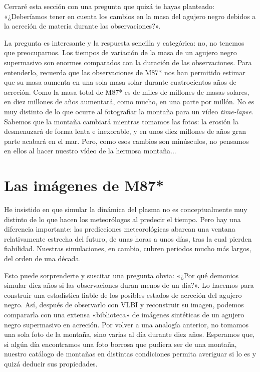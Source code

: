 Cerraré esta sección con una pregunta que quizá te hayas planteado: «¿Deberíamos tener en cuenta los cambios en la masa del agujero negro debidos a la acreción de materia durante las observaciones?».

La pregunta es interesante y la respuesta sencilla y categórica: no, no tenemos que preocuparnos. Los tiempos de variación de la masa de un agujero negro supermasivo son enormes comparados con la duración de las observaciones. Para entenderlo, recuerda que las observaciones de M87* nos han permitido estimar que su masa aumenta en una sola masa solar durante cuatrocientos años de acreción. Como la masa total de M87* es de miles de millones de masas solares, en diez millones de años aumentará, como mucho, en una parte por millón. No es muy distinto de lo que ocurre al fotografiar la montaña para un vídeo \emph{time-lapse}. Sabemos que la montaña cambiará mientras tomamos las fotos: la erosión la desmenuzará de forma lenta e inexorable, y en unos diez millones de años gran parte acabará en el mar. Pero, como esos cambios son minúsculos, no pensamos en ellos al hacer nuestro vídeo de la hermosa montaña...

\section{Las imágenes de M87*}\label{sec:07-images}

He insistido en que simular la dinámica del plasma no es conceptualmente muy distinto de lo que hacen los meteorólogos al predecir el tiempo. Pero hay una diferencia importante: las predicciones meteorológicas abarcan una ventana relativamente estrecha del futuro, de unas horas a unos días, tras la cual pierden fiabilidad. Nuestras simulaciones, en cambio, cubren periodos mucho más largos, del orden de una década.

Esto puede sorprenderte y suscitar una pregunta obvia: «¿Por qué demonios simular diez años si las observaciones duran menos de un día?». Lo hacemos para construir una estadística fiable de los posibles estados de acreción del agujero negro. Así, después de observarlo con VLBI y reconstruir su imagen, podemos compararla con una extensa «biblioteca» de imágenes sintéticas de un agujero negro supermasivo en acreción. Por volver a una analogía anterior, no tomamos una sola foto de la montaña, sino varias al día durante diez años. Esperamos que, si algún día encontramos una foto borrosa que pudiera ser de una montaña, nuestro catálogo de montañas en distintas condiciones permita averiguar si lo es y quizá deducir sus propiedades.

